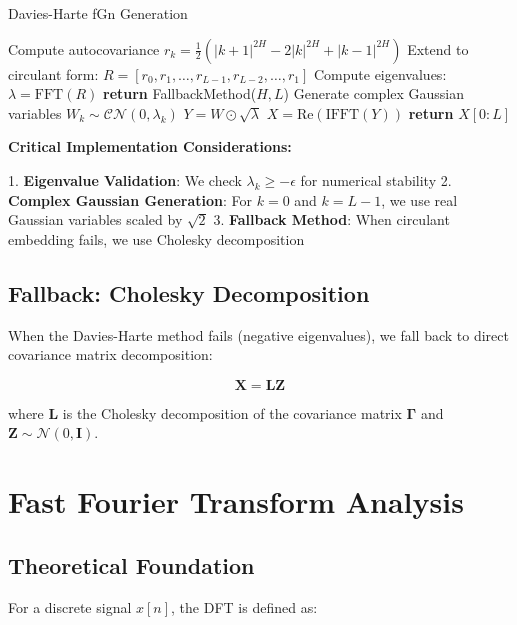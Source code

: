 \documentclass[11pt,a4paper]{article}
\begin{document}
\begin{algorithm}
\caption{Davies-Harte fGn Generation}
\begin{algorithmic}[1]
    \State Compute autocovariance $r_k = \frac{1}{2}(|k+1|^{2H} - 2|k|^{2H} + |k-1|^{2H})$
    \State Extend to circulant form: $R = [r_0, r_1, \ldots, r_{L-1}, r_{L-2}, \ldots, r_1]$
    \State Compute eigenvalues: $\lambda = \text{FFT}(R)$
    \If{$\min(\lambda) < -\epsilon$}
        \State \textbf{return} FallbackMethod($H, L$)
    \EndIf
    \State Generate complex Gaussian variables $W_k \sim \mathcal{CN}(0, \lambda_k)$
    \State $Y = W \odot \sqrt{\lambda}$
    \State $X = \text{Re}(\text{IFFT}(Y))$
    \State \textbf{return} $X[0:L]$
\EndProcedure
\end{algorithmic}
\end{algorithm}

\textbf{Critical Implementation Considerations:}

1. \textbf{Eigenvalue Validation}: We check $\lambda_k \geq -\epsilon$ for numerical stability
2. \textbf{Complex Gaussian Generation}: For $k = 0$ and $k = L-1$, we use real Gaussian variables scaled by $\sqrt{2}$
3. \textbf{Fallback Method}: When circulant embedding fails, we use Cholesky decomposition

\subsection{Fallback: Cholesky Decomposition}

When the Davies-Harte method fails (negative eigenvalues), we fall back to direct covariance matrix decomposition:

\begin{equation}
\mathbf{X} = \mathbf{L}\mathbf{Z}
\end{equation}

where $\mathbf{L}$ is the Cholesky decomposition of the covariance matrix $\mathbf{\Gamma}$ and $\mathbf{Z} \sim \mathcal{N}(0, \mathbf{I})$.

\section{Fast Fourier Transform Analysis}

\subsection{Theoretical Foundation}

For a discrete signal $x[n]$, the DFT is defined as:
\end{document}
